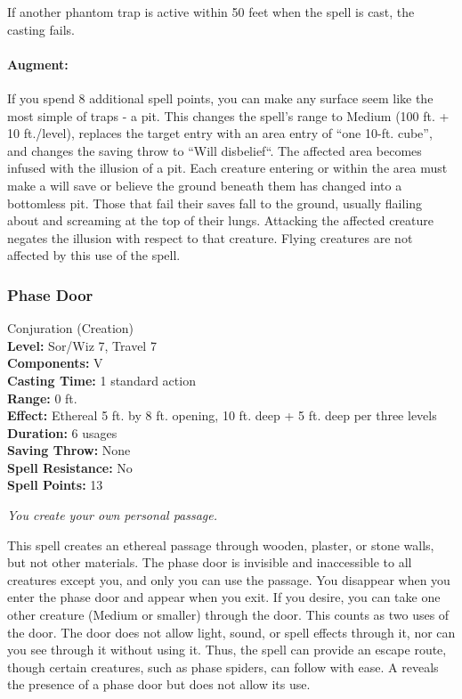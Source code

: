 If another phantom trap is active within 50 feet when the spell is cast, the casting fails.

\paragraph{Augment:} If you spend 8 additional spell points, you can make any surface seem like the most simple of traps - a pit.
This changes the spell's range to Medium (100 ft. + 10 ft./level), replaces the target entry with an area entry of
``one 10-ft. cube'', and changes the saving throw to ``Will disbelief``.
The affected area becomes infused with the illusion of a pit.
Each creature entering or within the area must make a will save or believe the ground beneath them has changed into a bottomless pit.
Those that fail their saves fall to the ground, usually flailing about and screaming at the top of their lungs.
Attacking the affected creature negates the illusion with respect to that creature.
Flying creatures are not affected by this use of the spell.

\subsubsection{Phase Door}
\label{Spell:PhaseDoor}
Conjuration (Creation)
\\ \textbf{Level:} Sor/Wiz 7, Travel 7
\\ \textbf{Components:} V
\\ \textbf{Casting Time:} 1 standard action
\\ \textbf{Range:} 0 ft.
\\ \textbf{Effect:} Ethereal 5 ft. by 8 ft. opening, 10 ft. deep + 5 ft. deep per three levels
\\ \textbf{Duration:} 6 usages
\\ \textbf{Saving Throw:} None
\\ \textbf{Spell Resistance:} No
\\ \textbf{Spell Points:} 13

\emph{You create your own personal passage.}

This spell creates an ethereal passage through wooden, plaster, or stone walls, but not other materials. 
The phase door is invisible and inaccessible to all creatures except you, and only you can use the passage. 
You disappear when you enter the phase door and appear when you exit. 
If you desire, you can take one other creature (Medium or smaller) through the door. 
This counts as two uses of the door. The door does not allow light, sound, or spell effects through it, nor can you see through it without using it. 
Thus, the spell can provide an escape route, though certain creatures, such as phase spiders, can follow with ease. 
A  reveals the presence of a phase door but does not allow its use.

